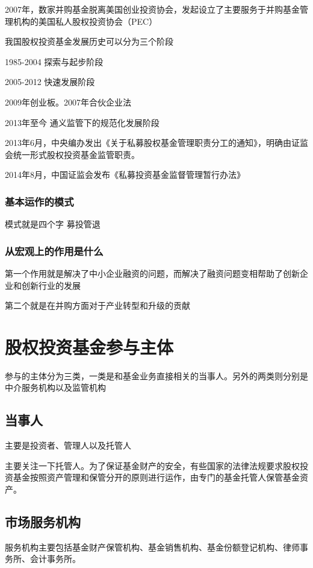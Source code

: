 \documentclass[UTF8,12pt]{ctexbook}
\numberwithin{equation}{section} %
\numberwithin{figure}{section}
\numberwithin{table}{section}
\begin{document}
	2007年，数家并购基金脱离美国创业投资协会，发起设立了主要服务于并购基金管理机构的美国私人股权投资协会（PEC）
	
	我国股权投资基金发展历史可以分为三个阶段
	
	1985-2004 探索与起步阶段
	
	
	2005-2012 快速发展阶段
	
	2009年创业板。2007年合伙企业法
	
	2013年至今 通义监管下的规范化发展阶段
	
	2013年6月，中央编办发出《关于私募股权基金管理职责分工的通知》，明确由证监会统一形式股权投资基金监管职责。
	
	2014年8月，中国证监会发布《私募投资基金监督管理暂行办法》
	
	
	
	\subsubsection{基本运作的模式}
	模式就是四个字 募投管退
	
	\subsubsection{从宏观上的作用是什么}
	第一个作用就是解决了中小企业融资的问题，而解决了融资问题变相帮助了创新企业和创新行业的发展
	
	第二个就是在并购方面对于产业转型和升级的贡献
	
	\section{股权投资基金参与主体}
	参与的主体分为三类，一类是和基金业务直接相关的当事人。另外的两类则分别是中介服务机构以及监管机构
	
	\subsection{当事人}
	主要是投资者、管理人以及托管人
	
	主要关注一下托管人。为了保证基金财产的安全，有些国家的法律法规要求股权投资基金按照资产管理和保管分开的原则进行运作，由专门的基金托管人保管基金资产。
	
	
	\subsection{市场服务机构}
	服务机构主要包括基金财产保管机构、基金销售机构、基金份额登记机构、律师事务所、会计事务所。
	
\end{document}
